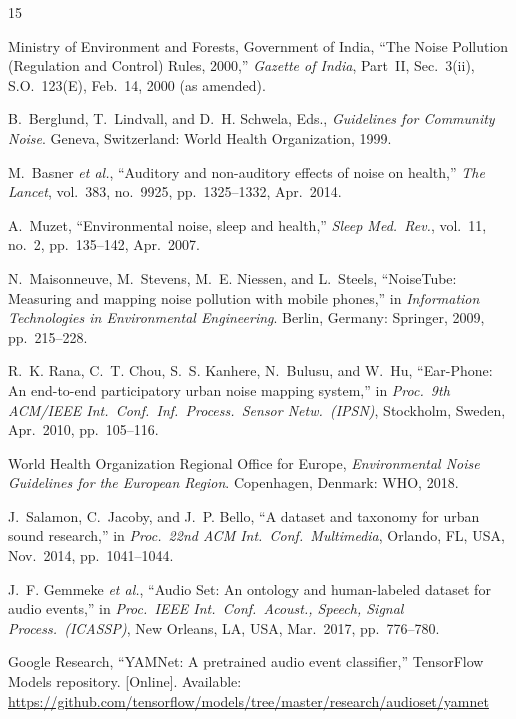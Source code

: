 \documentclass[conference]{IEEEtran}
\begin{document}
\begin{thebibliography}{15}

Ministry of Environment and Forests, Government of India, ``The Noise Pollution (Regulation and Control) Rules, 2000,'' \emph{Gazette of India}, Part~II, Sec.~3(ii), S.O.~123(E), Feb.\ 14, 2000 (as amended).

B.~Berglund, T.~Lindvall, and D.~H. Schwela, Eds., \emph{Guidelines for Community Noise}. Geneva, Switzerland: World Health Organization, 1999.

M.~Basner \emph{et al.}, ``Auditory and non-auditory effects of noise on health,'' \emph{The Lancet}, vol.~383, no.~9925, pp.~1325--1332, Apr.\ 2014.

A.~Muzet, ``Environmental noise, sleep and health,'' \emph{Sleep Med.\ Rev.}, vol.~11, no.~2, pp.~135--142, Apr.\ 2007.

N.~Maisonneuve, M.~Stevens, M.~E. Niessen, and L.~Steels, ``NoiseTube: Measuring and mapping noise pollution with mobile phones,'' in \emph{Information Technologies in Environmental Engineering}. Berlin, Germany: Springer, 2009, pp.~215--228.

R.~K. Rana, C.~T. Chou, S.~S. Kanhere, N.~Bulusu, and W.~Hu, ``Ear-Phone: An end-to-end participatory urban noise mapping system,'' in \emph{Proc.\ 9th ACM/IEEE Int.\ Conf.\ Inf.\ Process.\ Sensor Netw.\ (IPSN)}, Stockholm, Sweden, Apr.\ 2010, pp.~105--116.

World Health Organization Regional Office for Europe, \emph{Environmental Noise Guidelines for the European Region}. Copenhagen, Denmark: WHO, 2018.

J.~Salamon, C.~Jacoby, and J.~P. Bello, ``A dataset and taxonomy for urban sound research,'' in \emph{Proc.\ 22nd ACM Int.\ Conf.\ Multimedia}, Orlando, FL, USA, Nov.\ 2014, pp.~1041--1044.

J.~F. Gemmeke \emph{et al.}, ``Audio Set: An ontology and human-labeled dataset for audio events,'' in \emph{Proc.\ IEEE Int.\ Conf.\ Acoust., Speech, Signal Process.\ (ICASSP)}, New Orleans, LA, USA, Mar.\ 2017, pp.~776--780.

Google Research, ``YAMNet: A pretrained audio event classifier,'' TensorFlow Models repository. [Online]. Available: \url{https://github.com/tensorflow/models/tree/master/research/audioset/yamnet}


\end{thebibliography}
\end{document}
